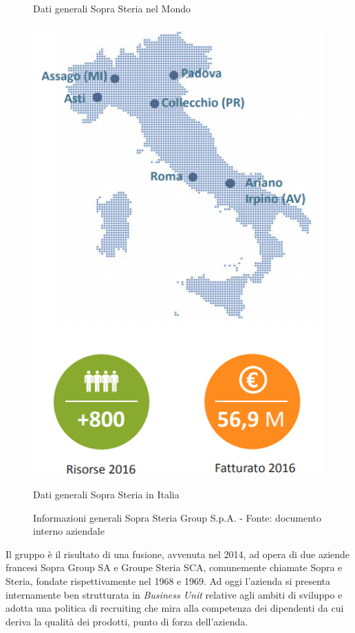 \begin{figure}[htbp]
\begin{minipage}[c]{.40\textwidth}
\caption{Dati generali Sopra Steria nel Mondo}
\end{minipage}%
\hspace{10mm}%
\begin{minipage}[c]{.40\textwidth}
\centering\setlength{\captionmargin}{0pt}%
\includegraphics[width=1.2\textwidth]{immagini/mappa_italia_fatturato}
\caption{Dati generali Sopra Steria in Italia}
\end{minipage}
\caption{Informazioni generali Sopra Steria Group S.p.A. - Fonte: documento interno aziendale}
\end{figure}


Il gruppo è il risultato di una fusione, avvenuta nel 2014, ad opera di due aziende francesi Sopra Group SA e Groupe Steria SCA, comunemente chiamate Sopra e Steria, fondate rispettivamente nel 1968 e 1969. Ad oggi l'azienda si presenta internamente ben strutturata in \textit{Business Unit} relative agli ambiti di sviluppo e adotta una politica di recruiting che mira alla competenza dei dipendenti da cui deriva la qualità dei prodotti, punto di forza dell'azienda.\\

